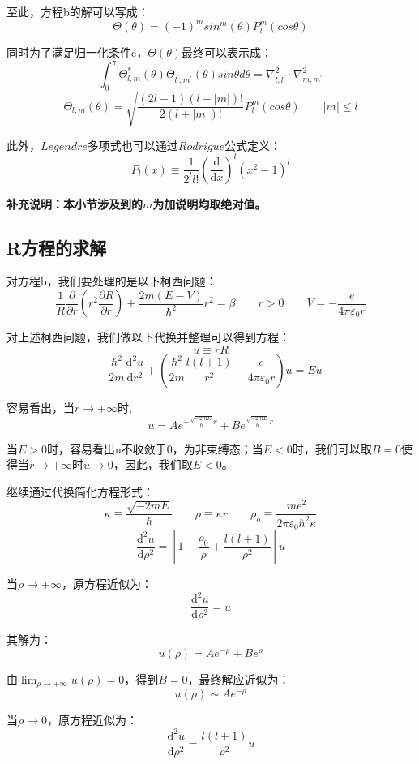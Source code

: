 至此，方程b的解可以写成：
\[\Theta(\theta)=(-1)^msin^m(\theta)P^m_l(cos\theta)\]

同时为了满足归一化条件e，$\Theta(\theta)$最终可以表示成：
\[\int_0^{\pi}\Theta_{l,m}^{*}(\theta)\Theta_{l^{'},m^{'}}(\theta)sin\theta d\theta=\nabla^2_{l,l^{'}} \cdot \nabla^2_{m,m^{'}} \tag{e}\]
\[\Theta_{l,m}(\theta)=\sqrt{\frac{(2l-1)(l-|m|)!}{2(l+|m|)!}}P^{m}_l(cos\theta) \qquad |m| \leqslant l\]

此外，$Legendre$多项式也可以通过$Rodrigue$公式定义：
\[P_l(x) \equiv \frac{1}{2^ll!} \left ( \frac{\mathrm{d}}{\mathrm{d}x} \right )^l(x^2-1)^l\]

\textbf{补充说明：本小节涉及到的$m$为加说明均取绝对值。}

\subsection{R方程的求解}

对方程b，我们要处理的是以下柯西问题：
\[\frac{1}{R}\frac{\partial}{\partial{r}}(r^2\frac{\partial R}{\partial{r}})+\frac{2m(E-V)}{\hbar^2}r^2=\beta \qquad r>0 \qquad V=-\frac{e}{4 \pi \varepsilon_0 r}\]

对上述柯西问题，我们做以下代换并整理可以得到方程：
\[u \equiv rR\]
\[-\frac{\hbar^2}{2m}\frac{\mathrm{d^2}u}{\mathrm{d}r^2}+ \left (\frac{\hbar^2}{2m}\frac{l(l+1)}{r^2}-\frac{e}{4 \pi \varepsilon_0r} \right )u=Eu\]

容易看出，当$r \rightarrow +\infty$时,
\[u=Ae^{-\frac{\sqrt{-2mE}}{\hbar}r}+Be^{\frac{\sqrt{-2mE}}{\hbar}r}\]

当$E>0$时，容易看出u不收敛于0，为非束缚态；当$E<0$时，我们可以取$B=0$使得当$r \rightarrow +\infty$时$u \rightarrow 0$，因此，我们取$E<0$。

继续通过代换简化方程形式：
\[\kappa \equiv \frac{\sqrt{-2mE}}{\hbar} \qquad \rho \equiv \kappa r \qquad \rho_o \equiv \frac{me^2}{2 \pi \varepsilon_0 \hbar^2 \kappa}\]
\[\frac{\mathrm{d^2}u}{\mathrm{d}\rho^2}=\left [ 1-\frac{\rho_0}{\rho}+\frac{l(l+1)}{\rho^2} \right ]u\]

当$\rho \rightarrow +\infty$，原方程近似为：
\[\frac{\mathrm{d^2}u}{\mathrm{d}\rho^2}=u\]

其解为：
\[u(\rho)=Ae^{-\rho}+Be^{\rho}\]

由$\lim_{\rho \rightarrow +\infty}u(\rho)=0$，得到$B=0$，最终解应近似为：
\[u(\rho) \sim Ae^{-\rho}\]

当$\rho \rightarrow 0$，原方程近似为：
\[\frac{\mathrm{d^2}u}{\mathrm{d}\rho^2}=\frac{l(l+1)}{\rho^2}u\]

